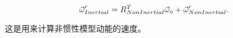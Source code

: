 \begin{equation}
\vec{\omega}'_{Inertial} = R^T_{NonInertial} \vec{\omega}_o + \vec{\omega}'_{NonInertial}.
\label{SC_comp}
\end{equation}

这是用来计算非惯性模型动能的速度。





%	
%		
%	
	
	


	





%
